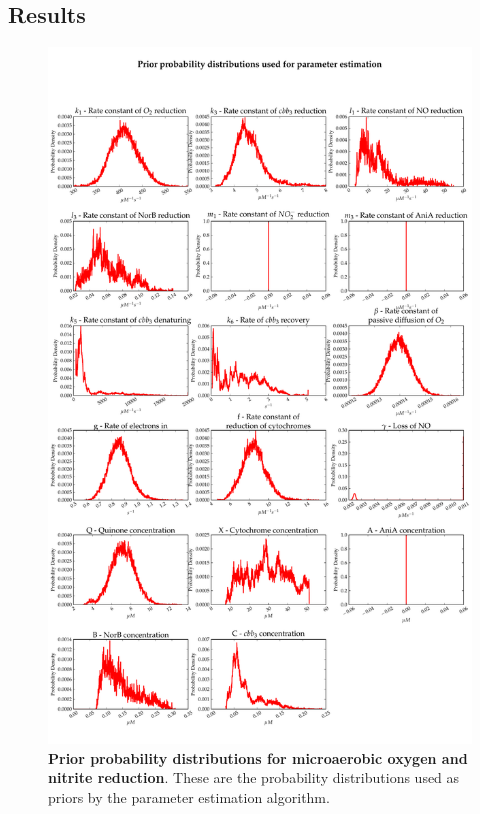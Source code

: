 \subsection{Results}
\begin{figure}[tbp]
 \centering
 \includegraphics[width=15cm, trim=0cm 0cm 0cm 0cm]{./07-nitritereduction/data/priors1.pdf}
 \caption[Prior probability distributions for microaerobic oxygen and nitrite reduction]{{\bf Prior probability distributions for microaerobic oxygen and nitrite reduction}. These are the probability distributions used as priors by the parameter estimation algorithm.
 \label{fig:nitrite_priors1}}
\end{figure}
\afterpage{\clearpage}

